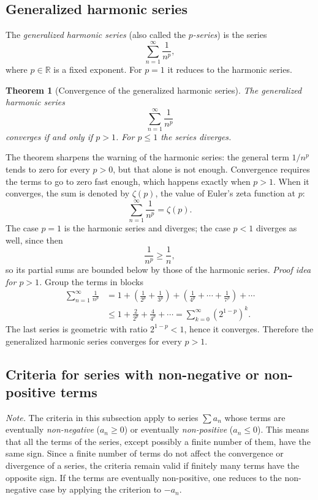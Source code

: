 \documentclass[11pt,a4paper]{article}
\theoremstyle{definition} \newtheorem{definition}{Definition} \theoremstyle{plain} \newtheorem{theorem}{Theorem}
\begin{document}
\subsection{Generalized harmonic series}\label{sec:series-genharmonic}
The \emph{generalized harmonic series} (also called the \emph{$p$-series}) is the series
\[ \sum_{n=1}^{\infty} \frac{1}{n^p}, \]
where $p\in\mathbb{R}$ is a fixed exponent.
For $p=1$ it reduces to the harmonic series.
\begin{theorem}[Convergence of the generalized harmonic series]\label{thm:generalized-harmonic} The generalized harmonic series
\[ \sum_{n=1}^{\infty} \frac{1}{n^p} \]
converges if and only if $p>1$.
For $p\le 1$ the series diverges. \end{theorem}
The theorem sharpens the warning of the harmonic series: the general term $1/n^p$ tends to zero for every $p>0$, but that alone is not enough.
Convergence requires the terms to go to zero fast enough, which happens exactly when $p>1$.
When it converges, the sum is denoted by $\zeta(p)$, the value of Euler's zeta function at $p$:
\[ \sum_{n=1}^{\infty} \frac{1}{n^p} = \zeta(p). \]
The case $p=1$ is the harmonic series and diverges; the case $p<1$ diverges as well, since then
\[ \frac{1}{n^p} \ge \frac{1}{n}, \]
so its partial sums are bounded below by those of the harmonic series.
\emph{Proof idea for $p>1$.}
Group the terms in blocks
\[ \begin{aligned} \sum_{n=1}^{\infty} \frac{1}{n^p} &= 1 + \left(\frac{1}{2^p}+\frac{1}{3^p}\right) + \left(\frac{1}{4^p}+\cdots+\frac{1}{7^p}\right) + \cdots \\ &\le 1 + \frac{2}{2^p} + \frac{4}{4^p} + \cdots
= \sum_{k=0}^{\infty} \left(2^{1-p}\right)^k. \end{aligned} \]
The last series is geometric with ratio $2^{1-p}<1$, hence it converges.
Therefore the generalized harmonic series converges for every $p>1$.
\subsection{Criteria for series with non-negative or non-positive terms}\label{sec:series-criteria}
\emph{Note.} The criteria in this subsection apply to series $\sum a_n$ whose terms are eventually \emph{non-negative} ($a_n\ge 0$) or eventually \emph{non-positive} ($a_n\le 0$). This means that all the terms of the series, except possibly a finite number of them, have the same sign. Since a finite number of terms do not affect the convergence or divergence of a series, the criteria remain valid if finitely many terms have the opposite sign. If the terms are eventually non-positive, one reduces to the non-negative case by applying the criterion to $-a_n$.
\end{document}
